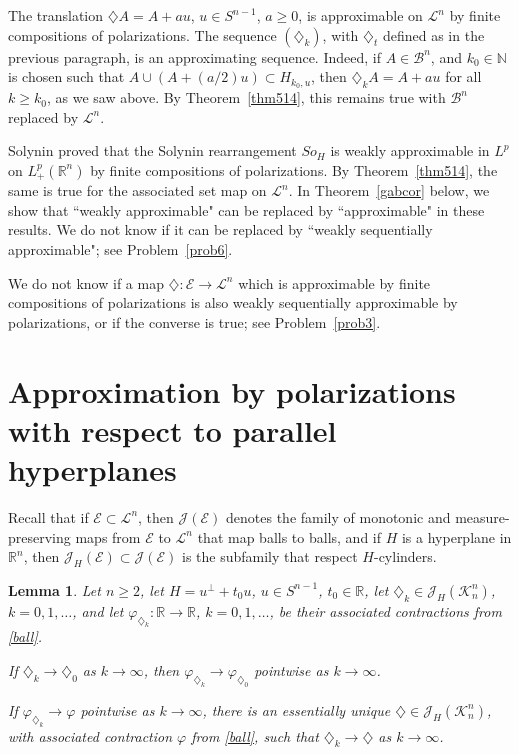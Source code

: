 \documentclass[12pt,reqno]{amsart}
\newcommand{\N}{{\mathbb N}}
\newcommand{\R}{{\mathbb R}}
\newcommand{\cK}{\mathcal K}
\newcommand{\cL}{\mathcal L}
\newcommand{\cJ}{\mathcal J}
\newcommand{\cE}{{\mathcal E}}
\newtheorem{lem}[thm]{Lemma}
\newcommand{\di}{\diamondsuit}
\numberwithin{equation}{section}
\begin{document}
The translation $\di A=A+au$, $u\in S^{n-1}$, $a\ge 0$, is approximable on ${\cL}^n$ by finite compositions of polarizations.  The sequence $(\di_k)$, with $\di_t$ defined as in the previous paragraph, is an approximating sequence. Indeed, if $A\in {\mathcal B}^n$, and $k_0\in \N$ is chosen such that $A\cup (A+(a/2)u)\subset H_{k_0,u}$, then $\di_kA=A+au$ for all $k\ge k_0$, as we saw above.  By Theorem~\ref{thm514}, this remains true with ${\mathcal B}^n$ replaced by $\cL^n$.

Solynin \cite{Sol1} proved that the Solynin rearrangement $So_H$ is weakly approximable in $L^p$ on $L^p_+(\R^n)$ by finite compositions of polarizations. By Theorem~\ref{thm514}, the same is true for the associated set map on ${\cL}^n$.  In Theorem~\ref{gabcor} below, we show that ``weakly approximable" can be replaced by ``approximable" in these results.  We do not know if it can be replaced by ``weakly sequentially approximable"; see Problem~\ref{prob6}.

We do not know if a map $\di:\cE\to \cL^n$ which is approximable by finite compositions of polarizations is also weakly sequentially approximable by polarizations, or if the converse is true; see Problem~\ref{prob3}.


\section{Approximation by polarizations with respect to parallel hyperplanes}\label{Approximation}

Recall that if $\cE\subset \cL^n$, then $\cJ(\cE)$ denotes the family of monotonic and measure-preserving maps from $\cE$ to $\cL^n$ that map balls to balls, and if $H$ is a hyperplane in $\R^n$, then $\cJ_H(\cE)\subset \cJ(\cE)$ is the subfamily that respect $H$-cylinders.

\begin{lem}\label{lem12024}
Let $n\ge 2$, let $H=u^{\perp}+t_0u$, $u\in S^{n-1}$, $t_0\in \R$, let $\di_k\in \cJ_H(\cK_n^n)$, $k=0,1,\dots$, and let $\varphi_{\di_k}:\R\to\R$, $k=0,1,\dots$, be their associated contractions from \eqref{ball}.

 If $\di_k\to \di_0$ as $k\to\infty$, then $\varphi_{\di_k}\to \varphi_{\di_0}$ pointwise as $k\to \infty$.

 If $\varphi_{\di_k}\to \varphi$ pointwise as $k\to\infty$, there is an essentially unique $\di\in \cJ_H(\cK_n^n)$, with associated contraction $\varphi$ from \eqref{ball}, such that $\di_k\to\di$ as $k\to\infty$.
\end{lem}
\end{document}
